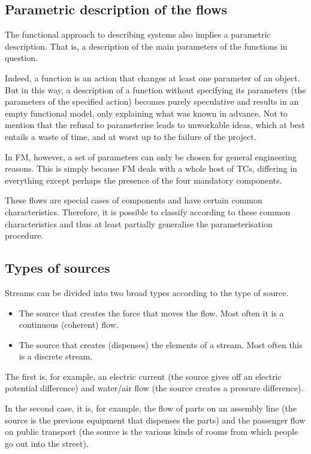 \documentclass[a4paper,11pt]{article}
\begin{document}
\subsection{Parametric description of the flows}

The functional approach to describing systems also implies a parametric
description. That is, a description of the main parameters of the functions in
question.

Indeed, a function is an action that changes at least one parameter of an
object. But in this way, a description of a function without specifying its
parameters (the parameters of the specified action) becomes purely speculative
and results in an empty functional model, only explaining what was known in
advance. Not to mention that the refusal to parameterise leads to unworkable
ideas, which at best entails a waste of time, and at worst up to the failure
of the project.

In FM, however, a set of parameters can only be chosen for general engineering
reasons. This is simply because FM deals with a whole host of TCs, differing
in everything except perhaps the presence of the four mandatory components.

These flows are special cases of components and have certain common
characteristics. Therefore, it is possible to classify according to these
common characteristics and thus at least partially generalise the
parameterisation procedure.

\subsection{Types of sources}

Streams can be divided into two broad types according to the type of source.
\begin{itemize}
\item The source that creates the force that moves the flow. Most often it is
  a continuous (coherent) flow.
\item The source that creates (dispenses) the elements of a stream. Most often
  this is a discrete stream.
\end{itemize}
The first is, for example, an electric current (the source gives off an
electric potential difference) and water/air flow (the source creates a
pressure difference).

In the second case, it is, for example, the flow of parts on an assembly line
(the source is the previous equipment that dispenses the parts) and the
passenger flow on public transport (the source is the various kinds of rooms
from which people go out into the street).
\end{document}
